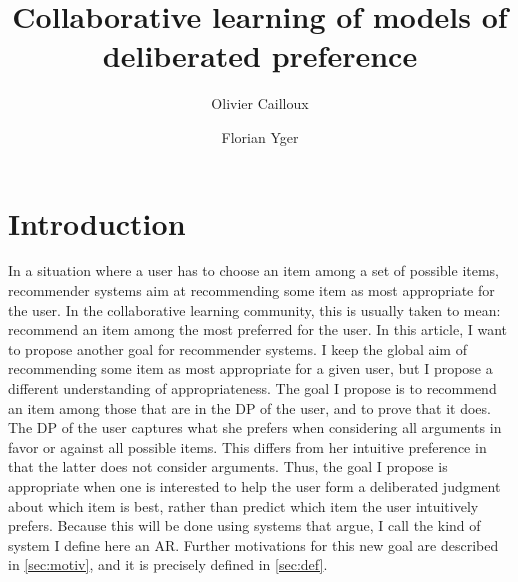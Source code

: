 \documentclass[french, english]{da2pl2018}
\begin{document}
\title{%
	Collaborative learning of models of deliberated preference%
}
\author{Olivier Cailloux}
\author{Florian Yger}
\makeatletter
\makeatother
\maketitle


\section{Introduction}
In a situation where a user has to choose an item among a set of possible items, recommender systems aim at recommending some item as most appropriate for the user.
In the collaborative learning community, this is usually taken to mean: recommend an item among the most preferred for the user. In this article, I want to propose another goal for recommender systems. I keep the global aim of recommending some item as most appropriate for a given user, but I propose a different understanding of appropriateness. The goal I propose is to recommend an item among those that are in the \ac{DP} of the user, and to prove that it does. The \ac{DP} of the user captures what she prefers when considering all arguments in favor or against all possible items. This differs from her intuitive preference in that the latter does not consider arguments. Thus, the goal I propose is appropriate when one is interested to help the user form a deliberated judgment about which item is best, rather than predict which item the user intuitively prefers. Because this will be done using systems that argue, I call the kind of system I define here an \ac{AR}.
Further motivations for this new goal are described in \cref{sec:motiv}, and it is precisely defined in \cref{sec:def}.
\end{document}
